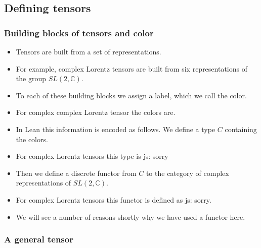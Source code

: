 \documentclass[a4paper, 11pt]{article}
\newcommand{\js}[1]{ {\color{magenta} js:  #1}}
\begin{document}
\subsection{Defining tensors}

\subsubsection{Building blocks of tensors and color}

\begin{itemize}
\item Tensors are built from a set of representations.
\item For example, complex Lorentz tensors are built from six representations of the group $SL(2, \mathbb{C})$.
\item To each of these building blocks we assign a label, which we call the color.
\item For complex complex Lorentz tensor the colors are. 
\item In Lean this information is encoded as follows. We define a type $C$ containing the colors.
\item For complex Lorentz tensors this type is \js{sorry} 
\item Then we define a discrete functor from $C$ to the category of complex representations of $SL(2, \mathbb{C})$.
\item For complex Lorentz tensors this functor is defined as \js{sorry}.
\item We will see a number of reasons shortly why we have used a functor here. 
\end{itemize}

\subsubsection{A general tensor}
\end{document}
